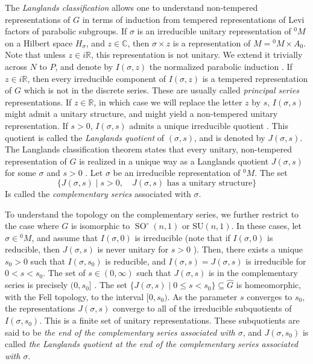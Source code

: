 \documentclass[12pt,reqno]{amsart}
\newcommand{\R}{\mathbb{R}}
\theoremstyle{definition}
\newcommand{\SO}{\operatorname{SO}}
\begin{document}
The \emph{Langlands classification} allows one to understand non-tempered representations of $G$ in terms of induction from tempered representations of Levi factors of parabolic subgroups. If $\sigma$ is an irreducible unitary representation of ${^0M}$ on a Hilbert space $H_\sigma$, and $z \in \mathbb{C}$, then $\sigma \times z$ is a representation of $M={^0M} \times A_0$. Note that unless $z \in i\R$, this representation is not unitary. We extend it trivially across $N$ to $P$, and denote by $I(\sigma, z)$ the normalized parabolic induction \cite[Definition~III.3.2]{BorelWallach}. If $z \in i\mathbb{R}$, then every irreducible component of $I(\sigma,z)$ is a tempered representation of $G$ which is not in the discrete series. These are usually called \emph{principal series} representations. If $z \in \R$, in which case we will replace the letter $z$ by $s$, $I(\sigma,s)$ might admit a unitary structure, and might yield a non-tempered unitary representation. If $s > 0$, $I(\sigma, s)$ admits a unique irreducible quotient \cite[Corollary~IV.4.6]{BorelWallach}. This quotient is called the \emph{Langlands quotient} of $(\sigma,s)$, and is denoted by $J(\sigma,s)$. The Langlands classification theorem states that every unitary, non-tempered representation of $G$ is realized in a unique way as a Langlands quotient $J(\sigma,s)$ for some $\sigma$ and $s > 0$ \cite[Theorem~IV.4.11]{BorelWallach}. Let $\sigma$ be an irreducible representation of ${^0M}$. The set
$$\{ J(\sigma,s) \mid s > 0, \quad J(\sigma,s) \text{ has a unitary structure}\}$$
Is called the \emph{complementary series} associated with $\sigma$.

To understand the topology on the complementary series, we further restrict to the case where $G$ is isomorphic to $\SO^\circ(n,1)$ or $\mathrm{SU}(n,1)$. In these cases, let $\sigma \in {^0M}$, and assume that $I(\sigma,0)$ is irreducible (note that if $I(\sigma,0)$ is reducible, then $J(\sigma,s)$ is never unitary for $s>0$ \cite[Corollary~4.3]{KnappStein}). Then, there exists a unique $s_0 > 0$ such that $I(\sigma,s_0)$ is reducible, and $I(\sigma,s)=J(\sigma,s)$ is irreducible for $0 < s< s_0$. The set of $s \in (0, \infty)$ such that $J(\sigma,s)$ is in the complementary series is precisely $(0,s_0]$ \cite[Corollary~4.2]{KnappStein}. The set $\{J(\sigma,s) \mid 0 \leq s < s_0\} \subseteq \widehat{G}$ is homeomorphic, with the Fell topology, to the interval $[0,s_0)$. As the parameter $s$ converges to $s_0$, the representations $J(\sigma,s)$ converge to all of the irreducible subquotients of $I(\sigma,s_0)$. This is a finite set of unitary representations. These subquotients are said to be \emph{the end of the complementary series associated with $\sigma$}, and $J(\sigma,s_0)$ is called \emph{the Langlands quotient at the end of the complementary series associated with $\sigma$}.
\end{document}
